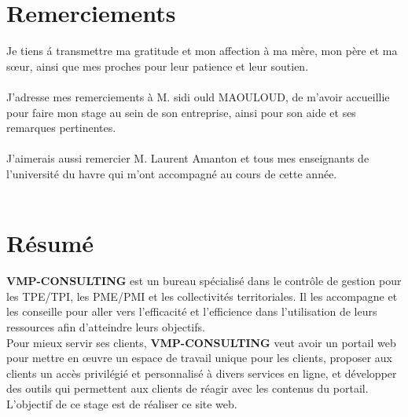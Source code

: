 \documentclass[12pt]{article}
\begin{document}
\section*{Remerciements}
Je tiens á transmettre ma gratitude et mon affection à ma mère, mon père  et ma
sœur, ainsi que mes proches pour leur patience et leur soutien.\\ \\

J’adresse mes remerciements à  M. sidi ould MAOULOUD, de m’avoir accueillie pour faire mon
stage au sein de son entreprise, ainsi pour son aide et  ses  remarques pertinentes.  \\ \\
J’aimerais aussi remercier M. Laurent Amanton  et tous mes enseignants de l’université du havre
qui m’ont accompagné 
au cours de cette année.\\ \\


\newpage

\section*{Résumé}
\textbf{VMP-CONSULTING}  est un bureau spécialisé dans le contrôle de gestion pour les TPE/TPI, les PME/PMI et les collectivités territoriales. Il les accompagne et les conseille pour aller vers l'efficacité et l'efficience dans l'utilisation de leurs ressources afin d'atteindre leurs objectifs.\\
Pour mieux servir ses clients, \textbf{VMP-CONSULTING}  veut avoir un portail web pour 
mettre en œuvre un espace de travail unique pour les clients, 
 proposer aux clients un accès privilégié et personnalisé à divers services en
ligne, et 
développer des outils qui permettent aux clients de réagir avec les contenus du
portail.\\
L'objectif de ce stage est de réaliser ce site web.
\end{document}
